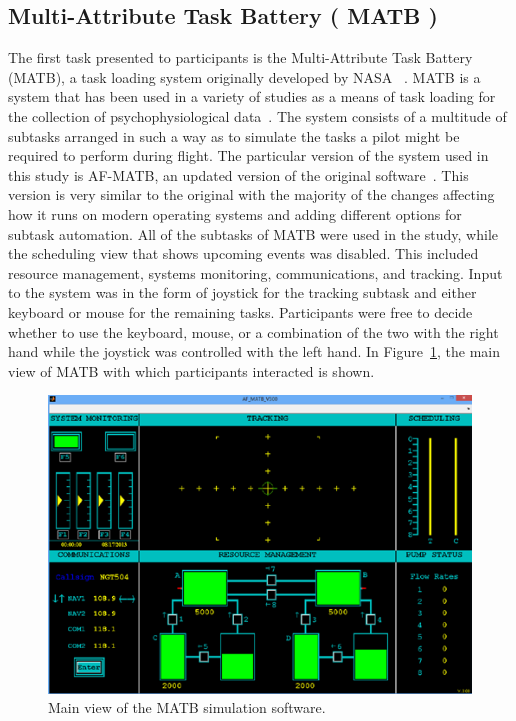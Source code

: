 \documentclass[11pt]{article}
\begin{document}
	\subsection{Multi-Attribute Task Battery ( MATB )}
	The first task presented to participants is the Multi-Attribute Task Battery (MATB), a task loading system originally developed by NASA ~\cite{}. MATB is a system that has been used in a variety of studies as a means of task loading for the collection of psychophysiological data~\cite{...}. The system consists of a multitude of subtasks arranged in such a way as to simulate the tasks a pilot might be required to perform during flight. The particular version of the system used in this study is AF-MATB, an updated version of the original software~\cite{...}. This version is very similar to the original with the majority of the changes affecting how it runs on modern operating systems and adding different options for subtask automation. All of the subtasks of MATB were used in the study, while the scheduling view that shows upcoming events was disabled. This included resource management, systems monitoring, communications, and tracking. Input to the system was in the form of joystick for the tracking subtask and either keyboard or mouse for the remaining tasks. Participants were free to decide whether to use the keyboard, mouse, or a combination of the two with the right hand while the joystick was controlled with the left hand. In Figure~\ref{fig:matb}, the main view of MATB with which participants interacted is shown. 
	
	\begin{figure}[]
	\centering
	\includegraphics[width=\linewidth]{figures/matb.png}
	\caption{Main view of the MATB simulation software. }
	\label{fig:matb}
	\end{figure}
	
\end{document}
